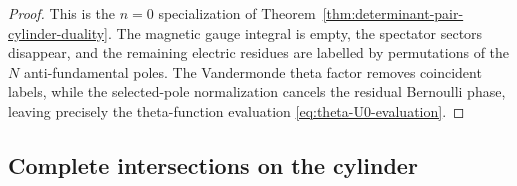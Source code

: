 \documentclass[11pt,a4paper]{article}
\numberwithin{equation}{section}
\theoremstyle{plain}
\theoremstyle{definition}
\theoremstyle{remark}
\begin{document}
\begin{proof}
This is the \(n=0\) specialization of Theorem~\ref{thm:determinant-pair-cylinder-duality}.  The magnetic gauge integral is empty, the spectator sectors disappear, and the remaining electric residues are labelled by permutations of the \(N\) anti-fundamental poles.  The Vandermonde theta factor removes coincident labels, while the selected-pole normalization cancels the residual Bernoulli phase, leaving precisely the theta-function evaluation \eqref{eq:theta-U0-evaluation}.
\end{proof}

\subsection{Complete intersections on the cylinder}
\label{sec:complete-intersections-cylinder}
\end{document}
